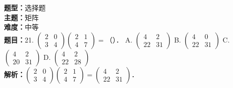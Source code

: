 \documentclass{ctexart}
\newenvironment{question}[5]{%
	\noindent\textbf{题型：}#1\\
	\textbf{主题：}#2\\
	\textbf{难度：}#3\\
	\textbf{题目：}#4\\
	\textbf{解析：}#5\\
	\vspace{1em}
}{}
\begin{document}
	
	\begin{question}
		{选择题}
		{矩阵}
		{中等}
		{21. \(\left(\begin{array}{ll}2 & 0 \\ 3 & 4\end{array}\right)\left(\begin{array}{ll}2 & 1 \\ 4 & 7\end{array}\right)=\)（）．
			A. \(\left(\begin{array}{cc}4 & 2 \\ 22 & 31\end{array}\right)\)
			B. \(\left(\begin{array}{cc}4 & 0 \\ 22 & 31\end{array}\right)\)
			C. \(\left(\begin{array}{cc}4 & 2 \\ 20 & 31\end{array}\right)\)
			D. \(\left(\begin{array}{cc}4 & 2 \\ 22 & 28\end{array}\right)\)}
		{\(\left(\begin{array}{ll}2 & 0 \\ 3 & 4\end{array}\right)\left(\begin{array}{ll}2 & 1 \\ 4 & 7\end{array}\right)=\left(\begin{array}{cc}4 & 2 \\ 22 & 31\end{array}\right)\)．}
	\end{question}
	
\end{document}
